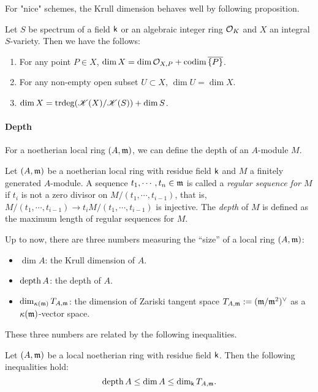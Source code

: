     For "nice" schemes, the Krull dimension behaves well by following proposition.

    \begin{proposition}
        Let $S$ be spectrum of a field $\mathsf{k}$ or an algebraic integer ring $\mathcal{O}_K$ and $X$ an integral $S$-variety.
        Then we have the follows:
        \begin{enumerate}[label=(\roman*)]
            \item For any point $P \in X$, $\dim X = \dim \mathcal{O}_{X,P} + \operatorname{codim} \overline{\{P\}}$.
            \item For any non-empty open subset $U \subset X$, $\dim U = \dim X$.
            \item $\dim X = \operatorname{trdeg}(\mathscr{K}(X)/\mathscr{K}(S)) + \dim S$.
        \end{enumerate}
    \end{proposition}


    \paragraph{Depth}

    For a noetherian local ring $(A,\mathfrak{m})$, we can define the depth of an $A$-module $M$.

    \begin{definition}
        Let $(A,\mathfrak{m})$ be a noetherian local ring with residue field $\mathsf{k}$ and $M$ a finitely generated $A$-module. 
        A sequence $t_1,\cdots,t_n\in \mathfrak{m}$ is called a \textit{regular sequence for $M$} if $t_i$ is not a zero divisor on $M/(t_1,\cdots,t_{i-1})$, that is, $M/(t_1,\cdots,t_{i-1}) \to t_iM/(t_1,\cdots,t_{i-1})$ is injective.
        The \textit{depth} of $M$ is defined as the maximum length of regular sequences for $M$.
    \end{definition}

    Up to now, there are three numbers measuring the ``size'' of a local ring $(A,\mathfrak{m})$:
    \begin{itemize}
        \item $\dim A$: the Krull dimension of $A$.
        \item $\operatorname{depth} A$: the depth of $A$.
        \item $\dim_{\kappa(\mathfrak{m})} T_{A,\mathfrak{m}}$: the dimension of Zariski tangent space $T_{A,\mathfrak{m}} := (\mathfrak{m}/\mathfrak{m}^2)^\lor$ as a ${\kappa(\mathfrak{m})}$-vector space.
    \end{itemize}

    These three numbers are related by the following inequalities.
    \begin{proposition}
        Let $(A,\mathfrak{m})$ be a local noetherian ring with residue field $\mathsf{k}$.
        Then the following inequalities hold:
        \[ \operatorname{depth} A \leq \dim A \leq \dim_{\mathsf{k}} T_{A,\mathfrak{m}}. \]
    \end{proposition}

